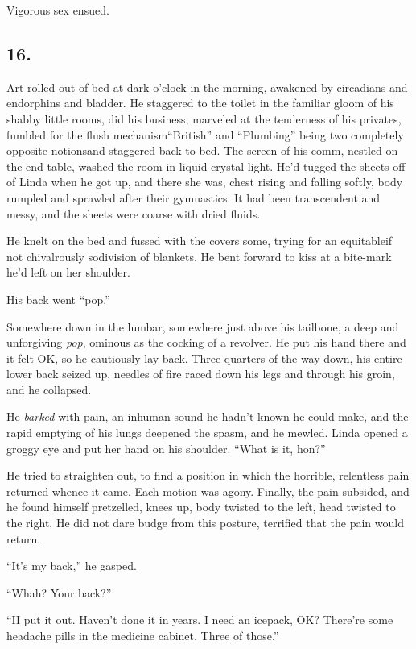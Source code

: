 Vigorous sex ensued.

\subsection{16.}

Art rolled out of bed at dark o’clock in the morning, awakened by
circadians and endorphins and bladder. He staggered to the toilet
in the familiar gloom of his shabby little rooms, did his business,
marveled at the tenderness of his privates, fumbled for the flush
mechanism{\dash}“British” and “Plumbing” being two completely opposite
notions{\dash}and staggered back to bed. The screen of his comm, nestled
on the end table, washed the room in liquid-crystal light. He’d
tugged the sheets off of Linda when he got up, and there she was,
chest rising and falling softly, body rumpled and sprawled after
their gymnastics. It had been transcendent and messy, and the
sheets were coarse with dried fluids.

He knelt on the bed and fussed with the covers some, trying for an
equitable{\dash}if not chivalrously so{\dash}division of blankets. He bent
forward to kiss at a bite-mark he’d left on her shoulder.

His back went “pop.”

Somewhere down in the lumbar, somewhere just above his tailbone, a
deep and unforgiving \emph{pop}, ominous as the cocking of a
revolver. He put his hand there and it felt OK, so he cautiously
lay back. Three-quarters of the way down, his entire lower back
seized up, needles of fire raced down his legs and through his
groin, and he collapsed.

He \emph{barked} with pain, an inhuman sound he hadn’t known he
could make, and the rapid emptying of his lungs deepened the spasm,
and he mewled. Linda opened a groggy eye and put her hand on his
shoulder. “What is it, hon?”

He tried to straighten out, to find a position in which the
horrible, relentless pain returned whence it came. Each motion was
agony. Finally, the pain subsided, and he found himself pretzelled,
knees up, body twisted to the left, head twisted to the right. He
did not dare budge from this posture, terrified that the pain would
return.

“It’s my back,” he gasped.

“Whah? Your back?”

“I{\dash}I put it out. Haven’t done it in years. I need an icepack, OK?
There’re some headache pills in the medicine cabinet. Three of
those.”

